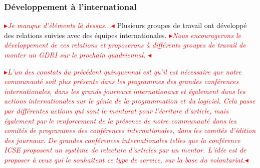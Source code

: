 \documentclass[11pt]{article}
\newcommand{\mynote}[3][black]{\textcolor{#1}{\fbox{\bfseries\sffamily\scriptsize{#2}}
{\small$\blacktriangleright$\textsf{\emph{#3}}$\blacktriangleleft$}}}
\newcommand{\TODO}[1]{\mynote[red]{TODO}{#1}}
\begin{document}



\subsubsection{Développement à l'international}
\TODO{Je manque d'éléments là dessus...}
Plusieurs groupes de travail ont développé des relations  suivies avec des équipes internationales.
\TODO{Nous encouragerons le développement de ces relations et proposerons à différents groupes de travail de monter un GDRI sur le prochain quadriennal. }

\TODO{L'un des constats du précédent quinquennal est qu'il est nécessaire que notre communauté soit plus présente dans les programmes des grandes conférences internationales,  dans les grands journaux internationaux et également dans les actions internationales sur le génie de la programmation et du logiciel. Cela passe par différentes actions qui sont le mentorat pour l'écriture d'article, mais également par le renforcement de la présence de notre communauté dans les comités de programmes des conférences internationales, dans les comités d'édition des journaux. De grandes conférences internationales telles que la conférence ICSE proposent un système de relecture d'articles par un mentor. L'idée est de proposer à ceux qui le souhaitent ce type de service, sur la base du volontariat.}
\end{document}
